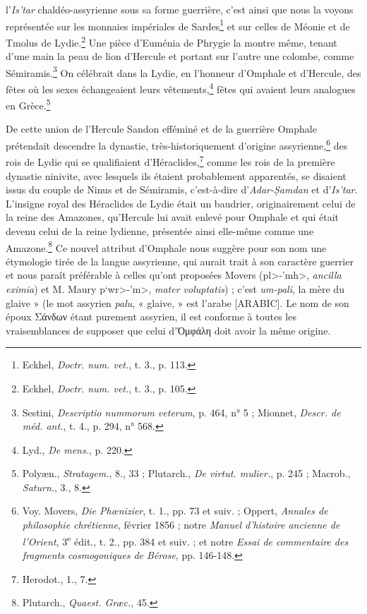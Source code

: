 \documentclass[a4paper, 11pt, oneside]{article}
\begin{document}
l'\emph{Is'tar} chaldéo-assyrienne sous sa forme guerrière, c'est ainsi que nous la voyons représentée sur les monnaies impériales de Sardes\footnote{Eckhel, \emph{Doctr. num. vet.}, t. 3., p. 113.} et sur celles de Méonie et de Tmolus de Lydie.\footnote{Eckhel, \emph{Doctr. num. vet.}, t. 3., p. 105.} Une pièce d'Euménia de Phrygie la montre même, tenant d'une main la peau de lion d'Hercule et portant sur l'autre une colombe, comme Sémiramis.\footnote{Sestini, \emph{Descriptio nummorum veterum}, p. 464, n° 5 ; Mionnet, \emph{Descr. de méd. ant.}, t. 4., p. 294, n° 568.} On célébrait dans la Lydie, en l'honneur d'Omphale et d'Hercule, des fêtes où les sexes échangeaient leurs vêtements,\footnote{Lyd., \emph{De mens.}, p. 220.} fêtes qui avaient leurs analogues en Grèce.\footnote{Polyæn., \emph{Stratagem.}, 8., 33 ; Plutarch., \emph{De virtut. mulier.}, p. 245 ; Macrob., \emph{Saturn.}, 3., 8.}

De cette union de l'Hercule Sandon efféminé et de la guerrière Omphale prétendait descendre la dynastie, très-historiquement d'origine assyrienne,\footnote{Voy. Movers, \emph{Die Phœnizier}, t. 1., pp. 73 et suiv. ; Oppert, \emph{Annales de philosophie chrétienne}, février 1856 ; notre \emph{Manuel d'histoire ancienne de l'Orient}, 3\textsuperscript{e} édit., t. 2., pp. 384 et suiv. ; et notre \emph{Essai de commentaire des fragments cosmogoniques de Bérose}, pp. 146-148.} des rois de Lydie qui se qualifiaient d'Héraclides,\footnote{Herodot., 1., 7.} comme les rois de la première dynastie ninivite, avec lesquels ils étaient probablement apparentés, se disaient issus du couple de Ninus et de Sémiramis, c'est-à-dire d'\emph{Adar-\d{S}amdan} et d'\emph{Is'tar}. L'insigne royal des Héraclides de Lydie était un baudrier, originairement celui de la reine des Amazones, qu'Hercule lui avait enlevé pour Omphale et qui était devenu celui de la reine lydienne, présentée ainsi elle-même comme une Amazone.\footnote{Plutarch., \emph{Quaest. Græc.}, 45.} Ce nouvel attribut d'Omphale nous suggère pour son nom une étymologie tirée de la langue assyrienne, qui aurait trait à son caractère guerrier et nous paraît préférable à celles qu'ont proposées Movers (\<pl>-\<'mh>, \emph{ancilla eximia}) et M. Maury \<p`wr>-\<'m>, \emph{mater voluptatis}) ; c'est \emph{um-pali}, la mère du glaive » (le mot assyrien \emph{palu}, « glaive, » est l'arabe [ARABIC]. Le nom de son époux Σάνδων étant purement assyrien, il est conforme à toutes les vraisemblances de supposer que celui d'Ὀμφάλη doit avoir la même origine.
\end{document}
